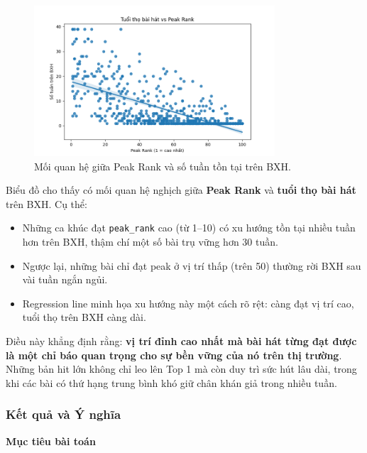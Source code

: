 \begin{enumerate}[label=\arabic*]
    \begin{figure}[H]
        \centering
        \includegraphics[width=0.8\textwidth]{../graphics/data3/Output/step4/longevity_vs_peak.png}
        \caption{Mối quan hệ giữa Peak Rank và số tuần tồn tại trên BXH.}
        \label{fig:longevity_vs_peak}
    \end{figure}
    
    Biểu đồ cho thấy có mối quan hệ nghịch giữa \textbf{Peak Rank} và \textbf{tuổi thọ bài hát} trên BXH.  
    Cụ thể:  
    \begin{itemize}
        \item Những ca khúc đạt \texttt{peak\_rank} cao (từ 1–10) có xu hướng tồn tại nhiều tuần hơn trên BXH, thậm chí một số bài trụ vững hơn 30 tuần.  
        \item Ngược lại, những bài chỉ đạt peak ở vị trí thấp (trên 50) thường rời BXH sau vài tuần ngắn ngủi.  
        \item Regression line minh họa xu hướng này một cách rõ rệt: càng đạt vị trí cao, tuổi thọ trên BXH càng dài.  
    \end{itemize}
    
    Điều này khẳng định rằng: \textbf{vị trí đỉnh cao nhất mà bài hát từng đạt được là một chỉ báo quan trọng cho sự bền vững của nó trên thị trường}. 
    Những bản hit lớn không chỉ leo lên Top 1 mà còn duy trì sức hút lâu dài, 
    trong khi các bài có thứ hạng trung bình khó giữ chân khán giả trong nhiều tuần.

\end{enumerate}

\subsubsection{Kết quả và Ý nghĩa}

    \textbf{Mục tiêu bài toán} \\
    
